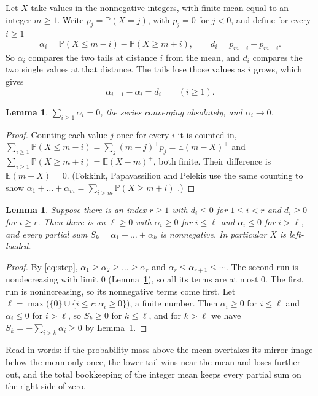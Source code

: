 \documentclass[11pt]{amsart}
\newtheorem{lem}[thm]{Lemma}
\theoremstyle{definition}
\theoremstyle{remark}
\newcommand{\Prob}{\mathbb P}
\newcommand{\E}{\mathbb E}
\begin{document}
Let $X$ take values in the nonnegative integers, with finite mean equal to an integer $m\ge1$. Write $p_j=\Prob(X=j)$,
with $p_j=0$ for $j<0$, and define for every $i\ge1$
\[
\alpha_i=\Prob(X\le m-i)-\Prob(X\ge m+i),\qquad d_i=p_{m+i}-p_{m-i}.
\]
So $\alpha_i$ compares the two tails at distance $i$ from the mean, and $d_i$ compares the two single values at that
distance. The tails lose those values as $i$ grows, which gives
\begin{equation}\label{eq:step}
\alpha_{i+1}-\alpha_i=d_i\qquad(i\ge1).
\end{equation}

\begin{lem}\label{lem:sum}
$\sum_{i\ge1}\alpha_i=0$, the series converging absolutely, and $\alpha_i\to0$.
\end{lem}

\begin{proof}
Counting each value $j$ once for every $i$ it is counted in, $\sum_{i\ge1}\Prob(X\le m-i)=\sum_j (m-j)^+p_j=\E(m-X)^+$
and $\sum_{i\ge1}\Prob(X\ge m+i)=\E(X-m)^+$, both finite. Their difference is $\E(m-X)=0$. (Fokkink,
Papavassiliou and Pelekis use the same counting to show $\alpha_1+\dots+\alpha_m=\sum_{i>m}\Prob(X\ge m+i)$
\cite[Lemma~2.1]{FPP}.)
\end{proof}

\begin{lem}\label{lem:main}
Suppose there is an index $r\ge1$ with $d_i\le0$ for $1\le i<r$ and $d_i\ge0$ for $i\ge r$. Then there is an $\ell\ge0$
with $\alpha_i\ge0$ for $i\le\ell$ and $\alpha_i\le0$ for $i>\ell$, and every partial sum $S_k=\alpha_1+\dots+\alpha_k$
is nonnegative. In particular $X$ is left-loaded.
\end{lem}

\begin{proof}
By \eqref{eq:step}, $\alpha_1\ge\alpha_2\ge\dots\ge\alpha_r$ and $\alpha_r\le\alpha_{r+1}\le\cdots$. The second run is
nondecreasing with limit $0$ (Lemma~\ref{lem:sum}), so all its terms are at most $0$. The first run is nonincreasing,
so its nonnegative terms come first. Let $\ell=\max\bigl(\{0\}\cup\{i\le r:\alpha_i\ge0\}\bigr)$, a finite
number. Then $\alpha_i\ge0$ for $i\le\ell$ and $\alpha_i\le0$ for $i>\ell$, so $S_k\ge0$ for $k\le\ell$, and for
$k>\ell$ we have $S_k=-\sum_{i>k}\alpha_i\ge0$ by Lemma~\ref{lem:sum}.
\end{proof}

Read in words: if the probability mass above the mean overtakes its mirror image below the mean only once, the lower
tail wins near the mean and loses further out, and the total bookkeeping of the integer mean keeps every partial sum on
the right side of zero.
\end{document}

